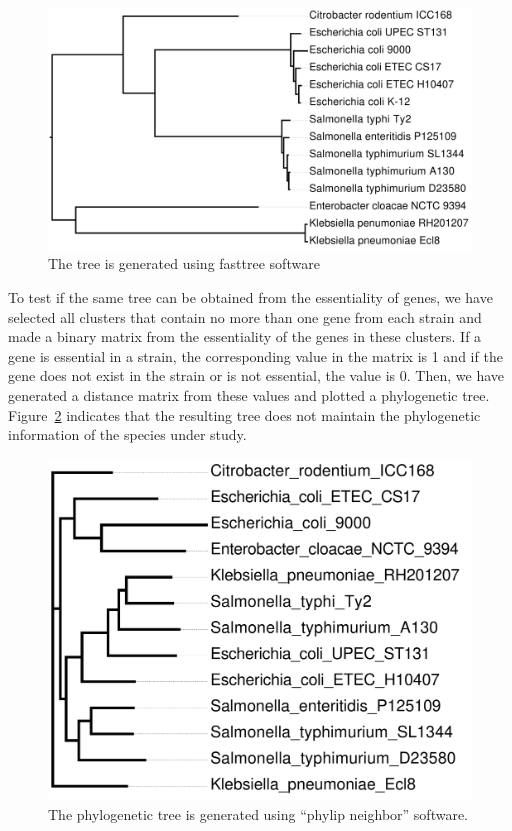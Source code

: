 \documentclass[a4paper,10pt, twocolumn]{article}
\begin{document}
\begin{figure}
\includegraphics[scale=0.14]{../speciestree/speciestree.pdf}
\caption{The tree is generated using fasttree software}
\label{fig:species-tree}
\end{figure}

To test if the same tree can be obtained from the essentiality of genes, we have selected all clusters that contain no more than one gene from each strain and made a binary matrix from the essentiality of the genes in these clusters. If a gene is essential in a strain, the corresponding value in the matrix is 1 and if the gene does not exist in the strain or is not essential, the value is 0. Then, we have generated a distance matrix from these values and plotted a phylogenetic tree.  Figure~\ref{fig:essentiality-tree} indicates that the resulting tree does not maintain the phylogenetic information of the species under study.

\begin{figure}
\includegraphics[scale=0.24]{make-essentiality-tree/essentiality-tree.pdf}
\caption{The phylogenetic tree is generated using ``phylip neighbor'' software.}
\label{fig:essentiality-tree}
\end{figure}
\end{document}
